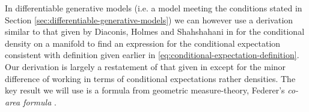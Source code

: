 In differentiable generative models (i.e. a model meeting the conditions stated in Section \ref{sec:differentiable-generative-models}) we can however use a derivation similar to that given by Diaconis, Holmes and Shahshahani in \citep{diaconis2013sampling} for the conditional density on a manifold to find an expression for the conditional expectation consistent with definition given earlier in \eqref{eq:conditional-expectation-definition}. Our derivation is largely a restatement of that given in \citep{diaconis2013sampling} except for the minor difference of working in terms of conditional expectations rather densities. %
The key result we will use is a formula from geometric measure-theory, Federer's \emph{co-area formula} \citep[\S 3.2.12]{federer2014geometric}.%

